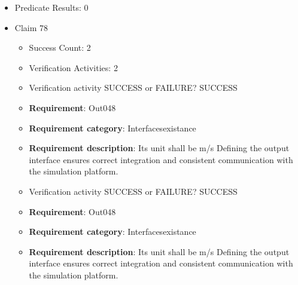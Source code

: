 \documentclass{article}
\begin{document}
\begin{itemize}
\begin{itemize}
						\item \textbf{Requirement}: Out047 
						\item \textbf{Requirement category}: Interfacesexistance 
						\item \textbf{Requirement description}: Its unit shall be Rad Defining the output interface ensures correct integration and consistent communication with the simulation platform.
					
					\item Verification activity SUCCESS or FAILURE? SUCCESS
		
						\item \textbf{Requirement}: Out047 
						\item \textbf{Requirement category}: Interfacesexistance 
						\item \textbf{Requirement description}: Its unit shall be Rad Defining the output interface ensures correct integration and consistent communication with the simulation platform.
					
				\end{itemize}
				
									    
				\item Predicate Results: 0

  				  \item Claim 78
				\begin{itemize}
			    	\item Success Count: 2 
			    	\item Verification Activities: 2
					\item Verification activity SUCCESS or FAILURE? SUCCESS
		
						\item \textbf{Requirement}: Out048 
						\item \textbf{Requirement category}: Interfacesexistance 
						\item \textbf{Requirement description}: Its unit shall be m/s Defining the output interface ensures correct integration and consistent communication with the simulation platform.
					
					\item Verification activity SUCCESS or FAILURE? SUCCESS
		
						\item \textbf{Requirement}: Out048 
						\item \textbf{Requirement category}: Interfacesexistance 
						\item \textbf{Requirement description}: Its unit shall be m/s Defining the output interface ensures correct integration and consistent communication with the simulation platform.
					

\end{itemize}
\end{itemize}
\end{document}
